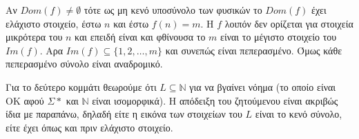 \documentclass[11pt]{article}
\begin{document}
Αν $Dom(f)\neq\emptyset$ τότε ως μη κενό υποσύνολο των φυσικών το $Dom(f)$ έχει ελάχιστο στοιχείο, έστω $n$ 
και έστω $f(n) = m$. Η $f$ λοιπόν δεν ορίζεται για στοιχεία μικρότερα του $n$ και επειδή είναι και φθίνουσα
το $m$ είναι το μέγιστο στοιχείο του $Im(f)$. Αρα $Im(f) \subseteq \{1,2,\ldots,m\}$ και συνεπώς είναι 
πεπερασμένο. Όμως κάθε πεπερασμένο σύνολο είναι αναδρομικό.

Για το δεύτερο κομμάτι θεωρούμε ότι $L\subseteq\mathbb{N}$ για να βγαίνει νόημα (το οποίο είναι OK αφού  
$\Sigma*$ και $\mathbb{N}$ είναι ισομορφικά). Η απόδειξη του ζητούμενου είναι ακριβώς ίδια με παραπάνω, 
δηλαδή είτε η εικόνα των στοιχείων του $L$ είναι το κενό σύνολο, είτε έχει όπως και πριν ελάχιστο στοιχείο.

\end{document}
